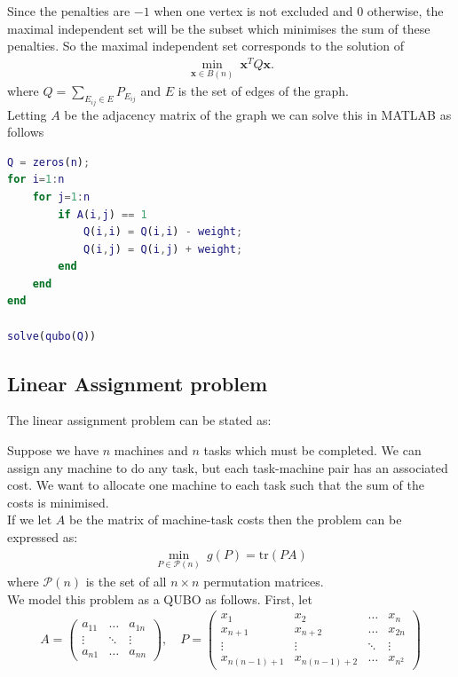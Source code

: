 \documentclass{article}
\begin{document}
\noindent Since the penalties are \(-1\) when one vertex is not excluded and 0 otherwise, the maximal independent set will be the subset which minimises the sum of these penalties. So the maximal independent set corresponds to the solution of
\begin{align*}
    \min_{\mathbf{x} \in B(n)} \: \mathbf{x}^T Q \mathbf{x}.
\end{align*}
where \(Q = \sum_{E_{ij} \in E} P_{E_{ij}}\) and \(E\) is the set of edges of the graph.\\

\noindent Letting \(A\) be the adjacency matrix of the graph we can solve this in MATLAB as follows
\begin{lstlisting}[language=MATLAB]
Q = zeros(n);
for i=1:n
    for j=1:n
        if A(i,j) == 1
            Q(i,i) = Q(i,i) - weight;
            Q(i,j) = Q(i,j) + weight;
        end
    end
end

solve(qubo(Q))
\end{lstlisting}

\subsection{Linear Assignment problem}

The linear assignment problem can be stated as:

Suppose we have \(n\) machines and \(n\) tasks which must be completed. We can assign any machine to do any task, but each task-machine pair has an associated cost. We want to allocate one machine to each task such that the sum of the costs is minimised. \\

\noindent If we let \(A\) be the matrix of machine-task costs then the problem can be expressed as: 
\begin{align*}
    \min_{P \in \mathcal{P}(n)} \: g(P) = \text{tr}(PA)
\end{align*}
where \(\mathcal{P}(n)\) is the set of all \(n \times n\) permutation matrices. \\

\noindent We model this problem as a QUBO as follows. First, let 
\begin{align*}
    A = \begin{pmatrix}
    a_{11} & \hdots & a_{1n} \\
    \vdots & \ddots & \vdots \\
    a_{n1} & \hdots & a_{nn}
\end{pmatrix}, \quad P = \begin{pmatrix}
    x_{1} & x_2 & \hdots & x_{n} \\
    x_{n + 1} & x_{n + 2} & \hdots & x_{2n} \\
    \vdots & \vdots & \ddots & \vdots \\
    x_{n(n-1)+1} & x_{n(n-1)+2} & \hdots & x_{n^2}
\end{pmatrix}
\end{align*}
\end{document}
